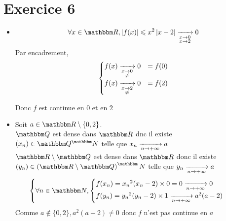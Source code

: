 \part{Exercice 6}

\begin{itemize}
	\item
		\[
			\forall x \in \R, \left| f(x) \right| \le x^2\left| x-2 \right| \tendsto{\substack{x \to 0\\x \to 2}}0
		\]
		Par encadrement, \[
			\begin{cases}
				f(x) \xrightarrow[\substack{x \to 0\\\neq }]{}0 &= f(0)\\
				f(x) \xrightarrow[\substack{x \to 2\\\neq }]{}0 &= f(2)
			\end{cases}
		\] 

		Donc $f$ est continue en $0$ et en $2$\\
	\item Soit $a \in \R\setminus \{0,2\}$.\\
		$\Q$ est dense dans $\R$ dnc il existe $(x_n) \in \Q^\N$ telle que $x_n \xrightarrow[n \to +\infty]{} a$\\
		$\R\setminus\Q$ est dense dans $\R$ donc il existe $(y_n) \in \left( \R\setminus\Q \right) ^\N$ telle que $y_n\xrightarrow[n \to +\infty]{} a$
		\[
			\begin{cases}
				\forall n \in \N,
				\begin{cases}
					f(x_n) = {x_n}^2 (x_n - 2) \times 0 = 0 \tendsto{n\to +\infty} 0\\
					f(y_n) = {y_n}^2 (y_n - 2) \times 1 \tendsto{n\to +\infty} a^2(a-2)\\
				\end{cases}
			\end{cases}
		\] Comme $a \not\in \{0,2\}, a^2(a-2) \neq 0$ donc $f$ n'est pas continue en $a$
\end{itemize}
